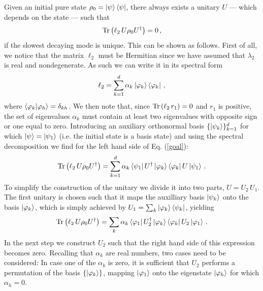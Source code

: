\documentclass[prl,floatfix,twocolumn,superscriptaddress,showpacs,preprintnumbers,longbibliography,nofootinbib]{revtex4-1}
\begin{document}
Given an initial pure state $\rho_{0}=\ket{\psi}\bra{\psi}$, there always exists a unitary $U$ --- which depends on the state --- such that
\begin{equation}
\Tr\left(\ell_2 \, U\rho_0 U^\dagger \right)=0\, ,
\label{goal}
\end{equation}
if the slowest decaying mode is unique. This can be shown as follows. First of all, we notice that the matrix $\ell_2$ must be Hermitian since we have assumed that $\lambda_2$ is real and nondegenerate. As such we can write it in its spectral form 
$$
\ell_2=\sum_{k=1}^d\alpha_k\ket{\varphi_k}\bra{\varphi_k}\, ,
$$
where $\bra{\varphi_k}\ket{\varphi_h}=\delta_{kh}$. We then note that, since ${\rm Tr}\left(\ell_2\, r_1\right)=0$ and $r_1$ is positive, the set of eigenvalues $\alpha_k$ must contain at least two eigenvalues with opposite sign or one equal to zero. Introducing an auxiliary orthonormal basis $\{\ket{\psi_k}\}_{k=1}^d$ for which $\ket{\psi}=\ket{\psi_1}$ (i.e. the initial state is a basis state) and using the spectral decomposition we find for the left hand side of Eq. (\ref{goal}):
$$
\Tr\left(\ell_2 \, U\rho_0 U^\dagger \right)=\sum_{k=1}^d\alpha_k\bra{\psi_1}U^\dagger\ket{\varphi_k}\bra{\varphi_k}U\ket{\psi_1}\, .
$$
To simplify the construction of the unitary we divide it into two parts, $U=U_2\, U_1$. The first unitary is chosen such that it maps the auxilliary basis $\ket{\psi_k}$ onto the basis $\ket{\varphi_k}$, which is simply achieved by  $U_1=\sum_k\ket{\varphi_k}\bra{\psi_k}$, yielding
$$
\Tr\left(\ell_2 \, U\rho_0 U^\dagger \right)=\sum_k\alpha_k\bra{\varphi_1}U_2^\dagger\ket{\varphi_k}\bra{\varphi_k}U_2\ket{\varphi_1}\, .
$$
In the next step we construct $U_2$ such that the right hand side of this expression becomes zero. Recalling that $\alpha_k$ are real numbers, two cases need to be considered: In case one of the $\alpha_k$ is zero, it is sufficient that $U_2$ performs a permutation of the basis $\{\ket{\varphi_k}\}$, mapping $\ket{\varphi_1}$ onto the eigenstate $\ket{\varphi_h}$ for which $\alpha_h=0$. 
\end{document}
